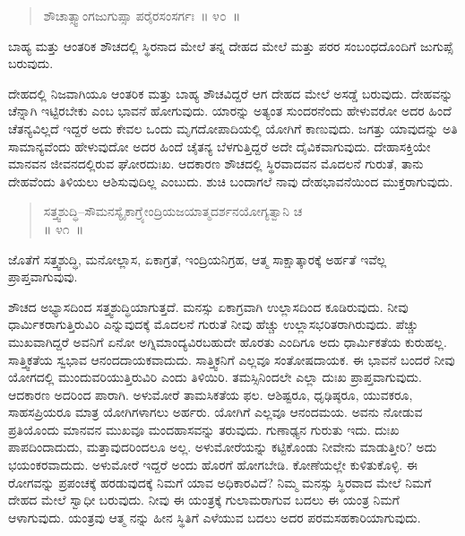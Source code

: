 \begin{verse}
ಶೌಚಾತ್ಸ್ವಾಂಗಜುಗುಪ್ಸಾ ಪರೈರಸಂಸರ್ಗಃ~॥ ೪೦~॥
\end{verse}

\vspace{-0.3cm}

ಬಾಹ್ಯ ಮತ್ತು ಆಂತರಿಕ ಶೌಚದಲ್ಲಿ ಸ್ಥಿರನಾದ ಮೇಲೆ ತನ್ನ ದೇಹದ ಮೇಲೆ ಮತ್ತು ಪರರ ಸಂಬಂಧದೊಂದಿಗೆ ಜುಗುಪ್ಸೆ ಬರುವುದು. 

ದೇಹದಲ್ಲಿ ನಿಜವಾಗಿಯೂ ಆಂತರಿಕ ಮತ್ತು ಬಾಹ್ಯ ಶೌಚವಿದ್ದರೆ ಆಗ ದೇಹದ ಮೇಲೆ ಅಸಡ್ಡೆ ಬರುವುದು. ದೇಹವನ್ನು ಚೆನ್ನಾಗಿ ಇಟ್ಟಿರಬೇಕು ಎಂಬ ಭಾವನೆ ಹೋಗುವುದು. ಯಾರನ್ನು ಅತ್ಯಂತ ಸುಂದರನೆಂದು ಹೇಳುವರೋ ಅದರ ಹಿಂದೆ ಚೆತನ್ಯವಿಲ್ಲದೆ ಇದ್ದರೆ ಅದು ಕೇವಲ ಒಂದು ಮೃಗದೋಪಾದಿಯಲ್ಲಿ ಯೋಗಿಗೆ ಕಾಣುವುದು. ಜಗತ್ತು ಯಾವುದನ್ನು ಅತಿ ಸಾಮಾನ್ಯವೆಂದು ಹೇಳುವುದೋ ಅದರ ಹಿಂದೆ ಚೈತನ್ಯ ಬೆಳಗುತ್ತಿದ್ದರೆ ಅದೇ ದೈವಿಕವಾಗುವುದು. ದೇಹಾಸಕ್ತಿಯೇ ಮಾನವನ ಜೀವನದಲ್ಲಿರುವ ಘೋರದುಃಖ. ಆದಕಾರಣ ಶೌಚದಲ್ಲಿ ಸ್ಥಿರವಾದವನ ಮೊದಲನೆ ಗುರುತೆ, ತಾನು ದೇಹವೆಂದು ತಿಳಿಯಲು ಆಶಿಸುವುದಿಲ್ಲ ಎಂಬುದು. ಶುಚಿ ಬಂದಾಗಲೆ ನಾವು ದೇಹಭಾವನೆಯಿಂದ ಮುಕ್ತರಾಗುವುದು. 

\vspace{-0.3cm}

\begin{verse}
ಸತ್ತ್ವಶುದ್ಧಿ–ಸೌಮನಸ್ಯೈಕಾಗ್ರ್ಯೇಂದ್ರಿಯಜಯಾತ್ಮದರ್ಶನಯೋಗ್ಯತ್ವಾನಿ ಚ\\॥ ೪೧~॥
\end{verse}

\vspace{-0.3cm}

ಜೊತೆಗೆ ಸತ್ತ್ವಶುದ್ಧಿ, ಮನೋಲ್ಲಾಸ, ಏಕಾಗ್ರತೆ, ಇಂದ್ರಿಯನಿಗ್ರಹ, ಆತ್ಮ ಸಾಕ್ಷಾತ್ಕಾರಕ್ಕೆ ಅರ್ಹತೆ ಇವೆಲ್ಲ ಪ್ರಾಪ್ತವಾಗುವುವು. 

ಶೌಚದ ಅಭ್ಯಾಸದಿಂದ ಸತ್ತ್ವಶುದ್ಧಿಯಾಗುತ್ತದೆ. ಮನಸ್ಸು ಏಕಾಗ್ರವಾಗಿ ಉಲ್ಲಾಸದಿಂದ ಕೂಡಿರುವುದು. ನೀವು ಧಾರ್ಮಿಕರಾಗುತ್ತಿರುವಿರಿ ಎನ್ನುವುದಕ್ಕೆ ಮೊದಲನೆ ಗುರುತೆ ನೀವು ಹೆಚ್ಚು ಉಲ್ಲಾಸಭರಿತರಾಗಿರುವುದು. ಪೆಚ್ಚು ಮುಖವಾಗಿದ್ದರೆ ಅವನಿಗೆ ಏನೋ ಅಗ್ನಿಮಾಂದ್ಯವಿರಬಹುದೇ ಹೊರತು ಎಂದಿಗೂ ಅದು ಧಾರ್ಮಿಕತೆಯ ಕುರುಹಲ್ಲ. ಸಾತ್ತ್ವಿಕತೆಯ ಸ್ವಭಾವ ಆನಂದದಾಯಕವಾದುದು. ಸಾತ್ತ್ವಿಕನಿಗೆ ಎಲ್ಲವೂ ಸಂತೋಷದಾಯಕ. ಈ ಭಾವನೆ ಬಂದರೆ ನೀವು ಯೋಗದಲ್ಲಿ ಮುಂದುವರಿಯುತ್ತಿರುವಿರಿ ಎಂದು ತಿಳಿಯಿರಿ. ತಮಸ್ಸಿನಿಂದಲೇ ಎಲ್ಲಾ ದುಃಖ ಪ್ರಾಪ್ತವಾಗುವುದು. ಆದಕಾರಣ ಅದರಿಂದ ಪಾರಾಗಿ. ಅಳುಮೋರೆ ತಾಮಸಿಕತೆಯ ಫಲ. ಆಶಿಷ್ಟರೂ, ಧೃಢಿಷ್ಠರೂ, ಯುವಕರೂ, ಸಾಹಸಪ್ರಿಯರೂ ಮಾತ್ರ ಯೋಗಿಗಳಾಗಲು ಅರ್ಹರು. ಯೋಗಿಗೆ ಎಲ್ಲವೂ ಆನಂದ\break ಮಯ. ಅವನು ನೋಡುವ ಪ್ರತಿಯೊಂದು ಮಾನವನ ಮುಖವೂ ಮಂದಹಾಸವನ್ನು ತರುವುದು. ಗುಣಾಢ್ಯನ ಗುರುತು ಇದು. ದುಃಖ ಪಾಪದಿಂದಾದುದು, ಮತ್ತಾವುದರಿಂದಲೂ ಅಲ್ಲ. ಅಳುಮೋರೆಯನ್ನು ಕಟ್ಟಿಕೊಂಡು ನೀವೇನು ಮಾಡುತ್ತೀರಿ? ಅದು ಭಯಂಕರವಾದುದು. ಅಳುಮೋರೆ ಇದ್ದರೆ ಅಂದು ಹೊರಗೆ ಹೋಗಬೇಡಿ. ಕೋಣೆಯಲ್ಲೇ ಕುಳಿತುಕೊಳ್ಳಿ. ಈ ರೋಗವನ್ನು ಪ್ರಪಂಚಕ್ಕೆ ಹರಡುವುದಕ್ಕೆ ನಿಮಗೆ ಯಾವ ಅಧಿಕಾರವಿದೆ? ನಿಮ್ಮ ಮನಸ್ಸು ಸ್ಥಿರವಾದ ಮೇಲೆ ನಿಮಗೆ ದೇಹದ ಮೇಲೆ ಸ್ವಾಧೀ ಬರುವುದು. ನೀವು ಈ ಯಂತ್ರಕ್ಕೆ ಗುಲಾಮರಾಗುವ ಬದಲು ಈ ಯಂತ್ರ ನಿಮಗೆ ಆಳಾಗುವುದು. ಯಂತ್ರವು ಆತ್ಮ ನನ್ನು ಹೀನ ಸ್ಥಿತಿಗೆ ಎಳೆಯುವ ಬದಲು ಅದರ ಪರಮಸಹಕಾರಿಯಾಗುವುದು. 

